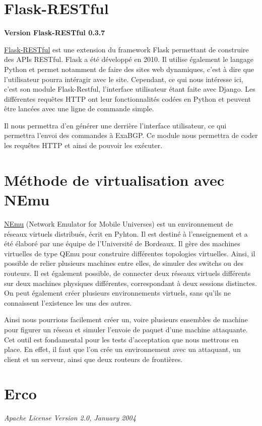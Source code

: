 \section{Flask-RESTful}
\textbf{Version Flask-RESTful 0.3.7}

\href{https://flask-restful.readthedocs.io/en/latest/}{Flask-RESTful} est une extension du framework Flask permettant de construire des APIs RESTful. Flask a été développé en 2010. Il utilise également le langage Python et permet notamment de faire des sites web dynamiques, c'est à dire que l'utilisateur pourra intéragir avec le site. Cependant, ce qui nous intéresse ici, c'est son module Flask-Restful, l'interface utilisateur étant faite avec Django. Les différentes requêtes HTTP ont leur fonctionnalités codées en Python et peuvent être lancées avec une ligne de commande simple.

Il nous permettra d'en générer une derrière l'interface utilisateur, ce qui permettra l'envoi des commandes à ExaBGP. Ce module nous permettra de coder les requêtes HTTP et ainsi de pouvoir les exécuter.

\section{Méthode de virtualisation avec NEmu}
\href{https://gitlab.com/v-a/nemu}{NEmu} (Network Emulator for Mobile Universes) est un environnement de réseaux virtuels distribués, écrit en Pyhton. Il est destiné à l'enseignement et a été élaboré par une équipe de l'Université de Bordeaux. Il gère des machines virtuelles de type QEmu pour construire différentes topologies virtuelles. Ainsi, il possible de relier plusieurs machines entre elles, de simuler des switchs ou des routeurs. Il est également possible, de connecter deux réseaux virtuels différents sur deux machines physiques différentes, correspondant à deux sessions distinctes. On peut également créer plusieurs environnements virtuels, sans qu'ils ne connaissent l'existence les uns des autres.

Ainsi nous pourrions facilement créer un, voire plusieurs ensembles de machine pour figurer un réseau et simuler l'envoie de paquet d'une machine attaquante. Cet outil est fondamental pour les tests d'acceptation que nous mettrons en place. En effet, il faut que l'on crée un environnement avec un attaquant, un client et un serveur, ainsi que deux routeurs de frontières.   

\section{Erco}
\textit{Apache License Version 2.0, January 2004}

